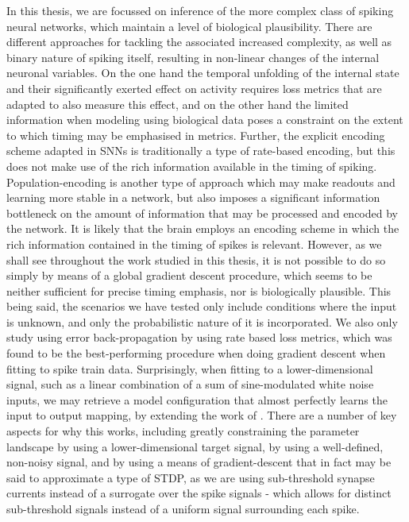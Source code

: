 \documentclass[mphil,deptreport,ianc]{infthesis} %
\begin{document}
In this thesis, we are focussed on inference of the more complex class of spiking neural networks, which maintain a level of biological plausibility.
There are different approaches for tackling the associated increased complexity, as well as binary nature of spiking itself, resulting in non-linear changes of the internal neuronal variables.
On the one hand the temporal unfolding of the internal state and their significantly exerted effect on activity requires loss metrics that are adapted to also measure this effect, and on the other hand the limited information when modeling using biological data poses a constraint on the extent to which timing may be emphasised in metrics.
Further, the explicit encoding scheme adapted in SNNs is traditionally a type of rate-based encoding, but this does not make use of the rich information available in the timing of spiking.
Population-encoding is another type of approach which may make readouts and learning more stable in a network, but also imposes a significant information bottleneck on the amount of information that may be processed and encoded by the network.
It is likely that the brain employs an encoding scheme in which the rich information contained in the timing of spikes is relevant. 
However, as we shall see throughout the work studied in this thesis, it is not possible to do so simply by means of a global gradient descent procedure, which seems to be neither sufficient for precise timing emphasis, nor is biologically plausible.
This being said, the scenarios we have tested only include conditions where the input is unknown, and only the probabilistic nature of it is incorporated.
We also only study using error back-propagation by using rate based loss metrics, which was found to be the best-performing procedure when doing gradient descent when fitting to spike train data.
Surprisingly, when fitting to a lower-dimensional signal, such as a linear combination of a sum of sine-modulated white noise inputs, we may retrieve a model configuration that almost perfectly learns the input to output mapping, by extending the work of \cite{Huh2017}.
There are a number of key aspects for why this works, including greatly constraining the parameter landscape by using a lower-dimensional target signal, by using a well-defined, non-noisy signal, and by using a means of gradient-descent that in fact may be said to approximate a type of STDP, as we are using sub-threshold synapse currents instead of a surrogate over the spike signals - which allows for distinct sub-threshold signals instead of a uniform signal surrounding each spike.
\end{document}
